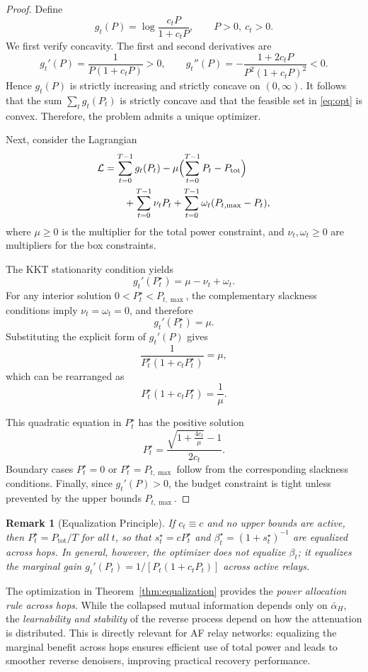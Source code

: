 \documentclass[journal]{IEEEtran}
\newtheorem{remark}{Remark}
\begin{document}
\begin{proof}
Define
\[
g_t(P) = \log\frac{c_tP}{1+c_tP}, \qquad P>0,\ c_t>0.
\]
We first verify concavity. The first and second derivatives are
\[
g_t'(P) = \frac{1}{P(1+c_tP)} > 0, \qquad
g_t''(P) = -\frac{1+2c_tP}{P^2(1+c_tP)^2} < 0.
\]
Hence $g_t(P)$ is strictly increasing and strictly concave on $(0,\infty)$. 
It follows that the sum $\sum_t g_t(P_t)$ is strictly concave and that 
the feasible set in \eqref{eq:opt} is convex. Therefore, the problem admits 
a unique optimizer.

Next, consider the Lagrangian
\[
\begin{aligned}
\mathcal{L} &= \sum_{t=0}^{T-1} g_t(P_t) 
- \mu\Bigl(\sum_{t=0}^{T-1} P_t - P_{\mathrm{tot}}\Bigr)\\
&\qquad+ \sum_{t=0}^{T-1} \nu_t P_t 
+ \sum_{t=0}^{T-1} \omega_t (P_{t,\max}-P_t),
\end{aligned}
\]
where $\mu\ge0$ is the multiplier for the total power constraint, 
and $\nu_t,\omega_t\ge0$ are multipliers for the box constraints.

The KKT stationarity condition yields
\[
g_t'(P_t^\star) = \mu - \nu_t + \omega_t.
\]
For any interior solution $0<P_t^\star<P_{t,\max}$, the complementary slackness 
conditions imply $\nu_t=\omega_t=0$, and therefore
\[
g_t'(P_t^\star) = \mu.
\]
Substituting the explicit form of $g_t'(P)$ gives
\[
\frac{1}{P_t^\star(1+c_tP_t^\star)} = \mu,
\]
which can be rearranged as
\[
P_t^\star(1+c_tP_t^\star) = \frac{1}{\mu}.
\]

This quadratic equation in $P_t^\star$ has the positive solution
\[
P_t^\star = \frac{\sqrt{1+\tfrac{4c_t}{\mu}}-1}{2c_t}.
\]
Boundary cases $P_t^\star=0$ or $P_t^\star=P_{t,\max}$ follow from the 
corresponding slackness conditions. Finally, since $g_t'(P)>0$, the 
budget constraint is tight unless prevented by the upper bounds 
$P_{t,\max}$. 
\end{proof}


\begin{remark}[Equalization Principle]
If $c_t\equiv c$ and no upper bounds are active, then 
$P_t^\star=P_{\mathrm{tot}}/T$ for all $t$, so that 
$s_t^\star=cP_t^\star$ and $\beta_t^\star=(1+s_t^\star)^{-1}$ 
are equalized across hops. 
In general, however, the optimizer does not equalize $\beta_t$; 
it equalizes the marginal gain $g_t'(P_t)=1/[P_t(1+c_tP_t)]$ 
across active relays.
\end{remark}

The optimization in Theorem~\ref{thm:equalization} provides the \emph{power allocation rule across hops}. 
While the collapsed mutual information depends only on $\bar\alpha_H$, the \emph{learnability and stability} of the reverse process depend on how the attenuation is distributed. 
This is directly relevant for AF relay networks: equalizing the marginal benefit across hops ensures efficient use of total power and leads to smoother reverse denoisers, improving practical recovery performance.
\end{document}
